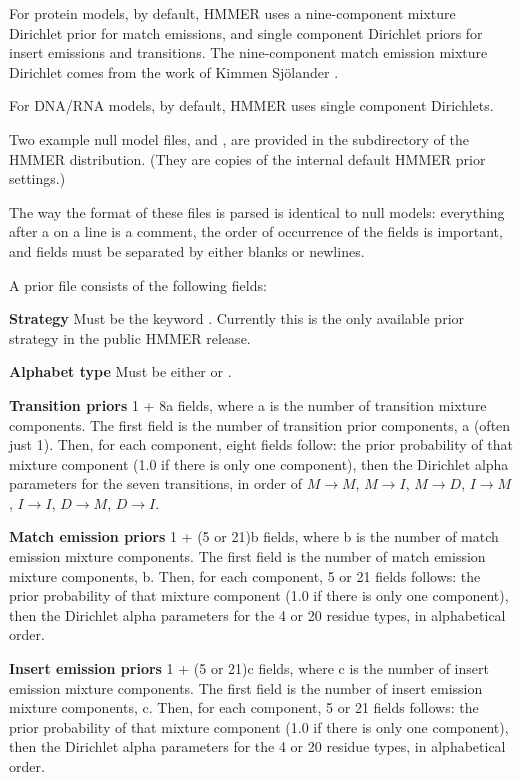 For protein models, by default, HMMER uses a nine-component mixture
Dirichlet prior for match emissions, and single component Dirichlet
priors for insert emissions and transitions. The nine-component match
emission mixture Dirichlet comes from the work of Kimmen Sj\"{o}lander
\cite{Sjolander96}.

For DNA/RNA models, by default, HMMER uses single component
Dirichlets.

Two example null model files,  and ,
are provided in the  subdirectory of the HMMER
distribution. (They are copies of the internal default HMMER prior
settings.)

The way the format of these files is parsed is identical to null
models: everything after a \prog{\#} on a line is a comment, the order
of occurrence of the fields is important, and fields must be separated
by either blanks or newlines.

A prior file consists of the following fields:

\begin{wideitem}
\item [\textbf{Strategy}] Must be the keyword . Currently 
this is the only available prior strategy in the public HMMER release.

\item [\textbf{Alphabet type}] Must be either  or
.

\item [\textbf{Transition priors}] 1 + 8a fields, where a
is the number of transition mixture components. The first field is the
number of transition prior components, a (often just 1). Then, for each
component, eight fields follow: the prior probability of that mixture
component (1.0 if there is only one component), then the Dirichlet
alpha parameters for the seven transitions, in order of $M \rightarrow
M$, $M \rightarrow I$, $M \rightarrow D$, $I \rightarrow M$, $I
\rightarrow I$, $D \rightarrow M$, $D \rightarrow I$.

\item [\textbf{Match emission priors}] 1 + (5 or 21)b fields,
where b is the number of match emission mixture components.  The first
field is the number of match emission mixture components, b. Then, for
each component, 5 or 21 fields follows: the prior probability of that
mixture component (1.0 if there is only one component), then the
Dirichlet alpha parameters for the 4 or 20 residue types, in
alphabetical order.

\item [\textbf{Insert emission priors}] 1 + (5 or 21)c fields,
where c is the number of insert emission mixture components.  The
first field is the number of insert emission mixture components,
c. Then, for each component, 5 or 21 fields follows: the prior
probability of that mixture component (1.0 if there is only one
component), then the Dirichlet alpha parameters for the 4 or 20
residue types, in alphabetical order.
\end{wideitem}

